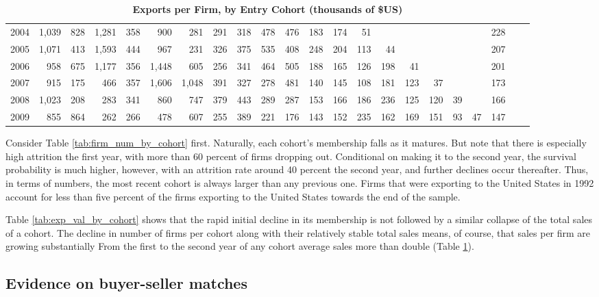 \begin{table}
{\begin{tabular}{l|rrrrrrrrrrrrrrrrrrrr|r}
2004 & 1,039 & 828  & 1,281 & 358  & 900   & 281   & 291  & 318  & 478  & 476  & 183  & 174  & 51   &      &      &      &      &      & 228 \\
2005 & 1,071 & 413  & 1,593 & 444  & 967   & 231   & 326  & 375  & 535  & 408  & 248  & 204  & 113  & 44   &      &      &      &      & 207 \\
2006 & 958   & 675  & 1,177 & 356  & 1,448 & 605   & 256  & 341  & 464  & 505  & 188  & 165  & 126  & 198  & 41   &      &      &      & 201 \\
2007 & 915   & 175  & 466   & 357  & 1,606 & 1,048 & 391  & 327  & 278  & 481  & 140  & 145  & 108  & 181  & 123  & 37   &      &      & 173 \\
2008 & 1,023 & 208  & 283   & 341  & 860   & 747   & 379  & 443  & 289  & 287  & 153  & 166  & 186  & 236  & 125  & 120  & 39   &      & 166 \\
2009 & 855   & 864  & 262   & 266  & 478   & 607   & 255  & 389  & 221  & 176  & 143  & 152  & 235  & 162  & 169  & 151  & 93   & 47   & 147 \\ \hline
    \end{tabular}
    }
    \caption{\textbf{Exports per Firm, by Entry Cohort (thousands of \$US)}}
    \label{tab:exp_per_firm_by_cohort}\centering
\end{table}

Consider Table \ref{tab:firm_num_by_cohort} first. Naturally, each cohort's
membership falls as it matures. But note that there is especially high
attrition the first year, with more than 60 percent of firms dropping out.
Conditional on making it to the second year, the survival probability is
much higher, however, with an attrition rate around 40 percent the second
year, and further declines occur thereafter. Thus, in terms of
numbers, the most recent cohort is always larger than any previous one.
Firms that were exporting to the United States in 1992 account for less than
five percent of the firms exporting to the United States towards the end of
the sample.

Table \ref{tab:exp_val_by_cohort} shows that the rapid initial decline in
its membership is not followed by a similar collapse of the total sales of a
cohort. The decline in number of firms per cohort along with their
relatively stable total sales means, of course, that sales per firm are
growing substantially From the first to the second year of any cohort
average sales more than double (Table \ref{tab:exp_per_firm_by_cohort}).

\subsection{Evidence on buyer-seller matches}

